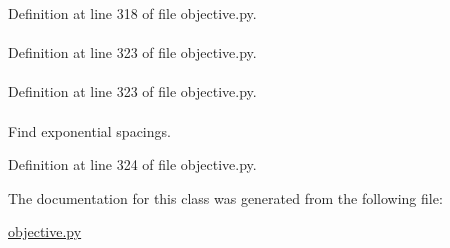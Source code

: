 \-Definition at line 318 of file objective.\-py.

\hypertarget{classforcebalance_1_1objective_1_1Penalty_a205b8adaf51199f59e18785806ffc567}{
\paragraph[{\-Pen\-\_\-\-Tab}]{}}\label{classforcebalance_1_1objective_1_1Penalty_a205b8adaf51199f59e18785806ffc567}


\-Definition at line 323 of file objective.\-py.

\hypertarget{classforcebalance_1_1objective_1_1Penalty_a8d4f7ac9e3dcd3a55fc2f175ee100a98}{
\paragraph[{ptyp}]{}}\label{classforcebalance_1_1objective_1_1Penalty_a8d4f7ac9e3dcd3a55fc2f175ee100a98}


\-Definition at line 323 of file objective.\-py.

\hypertarget{classforcebalance_1_1objective_1_1Penalty_a8faf40a164789edd6c5b6863892abef4}{
\paragraph[{spacings}]{}}\label{classforcebalance_1_1objective_1_1Penalty_a8faf40a164789edd6c5b6863892abef4}


\-Find exponential spacings. 



\-Definition at line 324 of file objective.\-py.



\-The documentation for this class was generated from the following file\-:\begin{DoxyCompactItemize}
\item 
\hyperlink{objective_8py}{objective.\-py}\end{DoxyCompactItemize}

